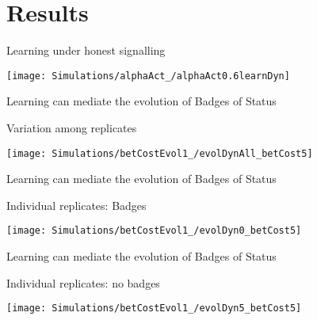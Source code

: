 \documentclass[
  ignorenonframetext,
]{beamer}
\begin{document}
\hypertarget{results}{%
\section{Results}\label{results}}

\begin{frame}{Learning under honest signalling}
\protect\hypertarget{learning-under-honest-signalling}{}

\begin{center}\texttt{[image: Simulations/alphaAct\_/alphaAct0.6learnDyn]} \end{center}

\end{frame}

\begin{frame}{Learning can mediate the evolution of Badges of Status}
\protect\hypertarget{learning-can-mediate-the-evolution-of-badges-of-status}{}

\begin{block}{Variation among replicates}

\begin{center}\texttt{[image: Simulations/betCostEvol1\_/evolDynAll\_betCost5]} \end{center}

\end{block}

\end{frame}

\begin{frame}{Learning can mediate the evolution of Badges of Status}
\protect\hypertarget{learning-can-mediate-the-evolution-of-badges-of-status-1}{}

\begin{block}{Individual replicates: Badges}

\begin{center}\texttt{[image: Simulations/betCostEvol1\_/evolDyn0\_betCost5]} \end{center}

\end{block}

\end{frame}

\begin{frame}{Learning can mediate the evolution of Badges of Status}
\protect\hypertarget{learning-can-mediate-the-evolution-of-badges-of-status-2}{}

\begin{block}{Individual replicates: no badges}

\begin{center}\texttt{[image: Simulations/betCostEvol1\_/evolDyn5\_betCost5]} \end{center}

\end{block}

\end{frame}
\end{document}
